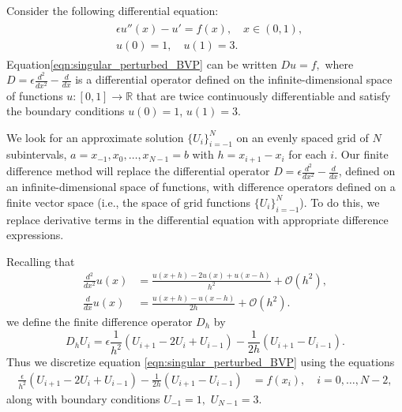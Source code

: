 Consider the following differential equation: 
\begin{align}
	\begin{split}
	&{ } \epsilon u''(x)-u'= f(x), \quad x \in (0,1), \\
	&{ } u(0) = 1, \quad u(1) = 3.
	\end{split} \label{eqn:singular_perturbed_BVP}
\end{align}
Equation\eqref{eqn:singular_perturbed_BVP} can be written $D u = f,$ where $D = \epsilon \frac{d^2}{dx^2} - \frac{d}{dx}$ is a differential operator defined on the infinite-dimensional space of functions $u:[0,1] \to \mathbb{R}$ that are twice continuously differentiable and satisfy the boundary conditions $u(0) = 1$, $u(1) = 3$.

We look for an approximate solution $\{U_i\}_{i=-1}^N$ on an evenly spaced grid of $N$ subintervals, $a = x_{-1}, x_0, \ldots, x_{N-1} = b$ with $h = x_{i+1}-x_i$ for each $i$.
Our finite difference method will replace the differential operator $D = \epsilon \frac{d^2}{dx^2} - \frac{d}{dx}$, defined on an infinite-dimensional space of functions, with difference operators defined on a finite vector space (i.e., the space of grid functions $\{U_i\}_{i=-1}^N$).
To do this, we replace derivative terms in the differential equation with appropriate difference expressions.

Recalling that 
\begin{align*}
	\frac{d^2}{dx^2} u(x) &= \frac{u(x+h)- 2u(x) + u(x-h)}{h^2} + \mathcal{O}(h^2),\\
\frac{d}{dx} u(x) &= \frac{u(x+h)-u(x-h)}{2h} + \mathcal{O}(h^2).
\end{align*}
we define the finite difference operator $D_h$ by  
\[
D_h U_i = \epsilon \frac{1}{h^2}\left(U_{i+1} -2U_i + U_{i-1}\right) - \frac{1}{2h} \left(U_{i+1}-U_{i-1} \right).
\]
Thus we discretize equation \eqref{eqn:singular_perturbed_BVP} using the equations 
\begin{align*}
	\frac{\epsilon}{h^2} (U_{i+1}- 2U_i + U_{i-1}) - \frac{1}{2h} \left(U_{i+1}-U_{i-1} \right)  &= f(x_i), \quad i = 0, \ldots, N-2,
\end{align*}
along with boundary conditions $U_{-1} = 1,$ $U_{N-1} = 3$.


